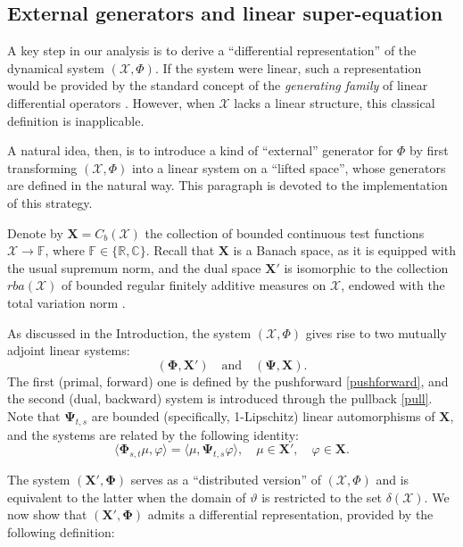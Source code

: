 \documentclass[sn-mathphys-num]{sn-jnl}
\numberwithin{equation}{section}
\theoremstyle{mythm}
\theoremstyle{mydef}
\renewcommand{\phi}{\varphi}
\begin{document}
\subsection{External generators and linear super-equation}\label{sec:G}
A key step in our analysis is to derive a ``differential representation'' of the dynamical system $(\mathcal{X}, \Phi)$. If the system were linear, such a representation would be provided by the standard concept of the \emph{generating family} of linear differential operators \cite[Section 4.9]{kolokoltsov2019differential}. However, when $\mathcal{X}$ lacks a linear structure, this classical definition is inapplicable.

A natural idea, then, is to introduce a kind of ``external'' generator for $\Phi$ by first transforming $(\mathcal{X}, \Phi)$ into a linear system on a ``lifted space'', whose generators are defined in the natural way. This paragraph is devoted to the implementation of this strategy.

Denote by $\bm{X} = C_b(\mathcal{X})$ the collection of bounded continuous test functions $\mathcal{X} \to \mathbb{F}$, where $\mathbb{F} \in \{\mathbb{R}, \mathbb{C}\}$. Recall that $\bm{X}$ is a Banach space, as it is equipped with the usual supremum norm, and the dual space $\bm{X}'$ is isomorphic to the collection \( rba(\mathcal{X}) \) of bounded regular finitely additive measures on \( \mathcal{X} \), endowed with the total variation norm \cite[Theorem~7.9.1]{bogachevMeasureTheoryVolume2007}.


As discussed in the Introduction, the system $(\mathcal{X}, \Phi)$ gives rise to two mutually adjoint linear systems:
\[
(\bm \Phi, \bm X') \quad \text{and} \quad (\bm \Psi, \bm X).
\]
The first (primal, forward) one is defined by the pushforward \eqref{pushforward}, and the second (dual, backward) system is introduced through the pullback \eqref{pull}. Note that $\bm{\Psi}_{t,s}$ are bounded (specifically, 1-Lipschitz) linear automorphisms of $\bm{X}$, and the systems are related by the following identity:
\begin{equation}\label{w-*Phi}
    \langle \bm \Phi_{s,t} \mu, \phi \rangle = \langle \mu, \bm{\Psi}_{t,s} \phi \rangle, \quad \mu \in \bm{X}', \quad \phi \in \bm{X}. 
\end{equation}

The system $(\bm X', \bm \Phi)$ serves as a ``distributed version'' of $(\mathcal{X}, \Phi)$ and is equivalent to the latter when the domain of $\vartheta$ is restricted to the set $\delta(\mathcal{X})$. We now show that $(\bm X', \bm \Phi)$ admits a differential representation, provided by the following definition:
\end{document}
